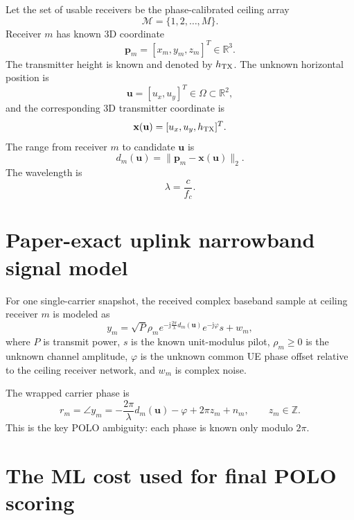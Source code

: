 \documentclass[11pt]{article}
\newcommand{\R}{\mathbb{R}}
\newcommand{\Z}{\mathbb{Z}}
\newcommand{\jj}{\mathrm{j}}
\begin{document}
Let the set of usable receivers be the phase-calibrated ceiling array
\begin{equation}
    \mathcal{M}=\{1,2,\ldots,M\}.
\end{equation}
Receiver $m$ has known 3D coordinate
\begin{equation}
    \mathbf{p}_m=[x_m,y_m,z_m]^T \in \R^3.
\end{equation}
The transmitter height is known and denoted by $h_{\rm TX}$. The unknown horizontal position is
\begin{equation}
    \mathbf{u}=[u_x,u_y]^T\in\Omega\subset\R^2,
\end{equation}
and the corresponding 3D transmitter coordinate is
\begin{equation}
    \mathbf{x}(\mathbf{u})=[u_x,u_y,h_{\rm TX}]^T.
\end{equation}
The range from receiver $m$ to candidate $\mathbf{u}$ is
\begin{equation}
    d_m(\mathbf{u})=\|\mathbf{p}_m-\mathbf{x}(\mathbf{u})\|_2.
\end{equation}
The wavelength is
\begin{equation}
    \lambda=\frac{c}{f_c}.
\end{equation}

\section{Paper-exact uplink narrowband signal model}

For one single-carrier snapshot, the received complex baseband sample at ceiling receiver $m$ is modeled as
\begin{equation}
    y_m = \sqrt{P}\rho_m
    e^{-\jj \frac{2\pi}{\lambda}d_m(\mathbf{u})}
    e^{-\jj\varphi}s + w_m,
    \label{eq:signal_model}
\end{equation}
where $P$ is transmit power, $s$ is the known unit-modulus pilot, $\rho_m\ge 0$ is the unknown channel amplitude, $\varphi$ is the unknown common UE phase offset relative to the ceiling receiver network, and $w_m$ is complex noise.

The wrapped carrier phase is
\begin{equation}
    r_m = \angle y_m
    = -\frac{2\pi}{\lambda}d_m(\mathbf{u}) - \varphi + 2\pi z_m+n_m,
    \qquad z_m\in\Z.
    \label{eq:phase_model}
\end{equation}
This is the key POLO ambiguity: each phase is known only modulo $2\pi$.

\section{The ML cost used for final POLO scoring}
\label{sec:ml_cost}
\end{document}
